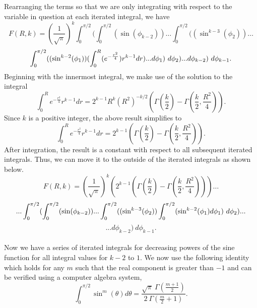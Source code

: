 \documentclass[11pt]{article} %
\begin{document}
\indent Rearranging the terms so that we are only integrating with respect to the variable in question at each iterated integral, we have
$$F(R, k) = \left(\frac{1}{\sqrt{\pi}}\right)^k \int^{\pi/2}_0(\int^{\pi/2}_0 (\sin(\phi_{k-2}))\dots\int^{\pi/2}_0 ( (\sin^{k-3}(\phi_2)) \dots $$
$$\int^{\pi/2}_0 ( (\sin^{k-2}(\phi_1))(\int^R_0(e^{-\frac{r^2}{4}}) r^{k-1} dr)...d\phi_1 ) \  d\phi_2 ) ...\\
d\phi_{k-2} ) \  d\phi_{k-1}.
$$
\indent    Beginning with the innermost integral, we make use of the solution to the integral
$$\int^R_0 e^{-\frac{r^2}{4}} r^{k-1}dr = 2^{k-1}R^k\left(R^2 \right)^{-k/2}
\left( \Gamma\left( \frac{k}{2}\right)-\Gamma\left( \frac{k}{2},\frac{R^2}{4}\right)\right).$$
%
\indent  Since $k$ is a positive integer, the above result simplifies to   \\
$$\int^R_0 e^{-\frac{r^2}{4}} r^{k-1}dr = 2^{k-1}\left( \Gamma\left( \frac{k}{2}\right)-\Gamma\left( \frac{k}{2},\frac{R^2}{4}\right)\right). $$
%
\indent    After integration, the result is a constant with respect to all subsequent iterated integrals.  Thus, we can move it to the outside of the iterated integrals as shown below.
%
$$F(R,k) = \left( \frac{1}{\sqrt{\pi}}\right)^k \left( 2^{k-1}\left( \Gamma\left( \frac{k}{2}\right)-\Gamma\left( \frac{k}{2},\frac{R^2}{4}\right)\right)\right)\dots $$
$$...\int^{\pi/2}_0(\int^{\pi/2}_0 (\sin(\phi_{k-2}))... \\ \\
\int^{\pi/2}_0 ( (\sin^{k-3}(\phi_2))\int^{\pi/2}_0 ( \sin^{k-2}(\phi_1)
 d\phi_1 ) \  d\phi_2 )... $$
$$...d\phi_{k-2} ) \  d\phi_{k-1}.$$ \\
%
\indent   Now we have a series of iterated integrals for decreasing powers of the sine function for all integral values for $k-2$ to $1$.  We now use the following identity which holds for any $m$ such that the real component is greater than $-1$ and can be verified using a computer algebra system, 
$$\int^{\pi/2}_0\sin^m(\theta) d\theta = \frac{\sqrt{\pi} \ \Gamma\left(\frac{m+1}{2}\right)}
{2 \ \Gamma\left(\frac{m}{2}+1\right)}.$$
%
\end{document}

